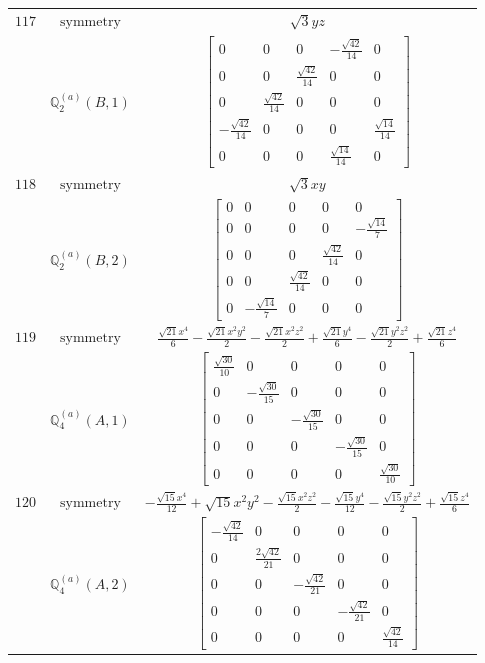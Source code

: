 \documentclass[fleqn,8pt,landscape]{jsarticle}
\begin{document}
\begin{longtable}{ccc}
$ 117 $ & $ \text{symmetry} $ & $ \sqrt{3} y z $ \\
$  $ & $ \mathbb{Q}_{2}^{(a)}(B,1) $ & $ \begin{bmatrix} 0 & 0 & 0 & - \frac{\sqrt{42}}{14} & 0 \\ 0 & 0 & \frac{\sqrt{42}}{14} & 0 & 0 \\ 0 & \frac{\sqrt{42}}{14} & 0 & 0 & 0 \\ - \frac{\sqrt{42}}{14} & 0 & 0 & 0 & \frac{\sqrt{14}}{14} \\ 0 & 0 & 0 & \frac{\sqrt{14}}{14} & 0 \end{bmatrix} $ \\ \hline
$ 118 $ & $ \text{symmetry} $ & $ \sqrt{3} x y $ \\
$  $ & $ \mathbb{Q}_{2}^{(a)}(B,2) $ & $ \begin{bmatrix} 0 & 0 & 0 & 0 & 0 \\ 0 & 0 & 0 & 0 & - \frac{\sqrt{14}}{7} \\ 0 & 0 & 0 & \frac{\sqrt{42}}{14} & 0 \\ 0 & 0 & \frac{\sqrt{42}}{14} & 0 & 0 \\ 0 & - \frac{\sqrt{14}}{7} & 0 & 0 & 0 \end{bmatrix} $ \\ \hline
$ 119 $ & $ \text{symmetry} $ & $ \frac{\sqrt{21} x^{4}}{6} - \frac{\sqrt{21} x^{2} y^{2}}{2} - \frac{\sqrt{21} x^{2} z^{2}}{2} + \frac{\sqrt{21} y^{4}}{6} - \frac{\sqrt{21} y^{2} z^{2}}{2} + \frac{\sqrt{21} z^{4}}{6} $ \\
$  $ & $ \mathbb{Q}_{4}^{(a)}(A,1) $ & $ \begin{bmatrix} \frac{\sqrt{30}}{10} & 0 & 0 & 0 & 0 \\ 0 & - \frac{\sqrt{30}}{15} & 0 & 0 & 0 \\ 0 & 0 & - \frac{\sqrt{30}}{15} & 0 & 0 \\ 0 & 0 & 0 & - \frac{\sqrt{30}}{15} & 0 \\ 0 & 0 & 0 & 0 & \frac{\sqrt{30}}{10} \end{bmatrix} $ \\ \hline
$ 120 $ & $ \text{symmetry} $ & $ - \frac{\sqrt{15} x^{4}}{12} + \sqrt{15} x^{2} y^{2} - \frac{\sqrt{15} x^{2} z^{2}}{2} - \frac{\sqrt{15} y^{4}}{12} - \frac{\sqrt{15} y^{2} z^{2}}{2} + \frac{\sqrt{15} z^{4}}{6} $ \\
$  $ & $ \mathbb{Q}_{4}^{(a)}(A,2) $ & $ \begin{bmatrix} - \frac{\sqrt{42}}{14} & 0 & 0 & 0 & 0 \\ 0 & \frac{2 \sqrt{42}}{21} & 0 & 0 & 0 \\ 0 & 0 & - \frac{\sqrt{42}}{21} & 0 & 0 \\ 0 & 0 & 0 & - \frac{\sqrt{42}}{21} & 0 \\ 0 & 0 & 0 & 0 & \frac{\sqrt{42}}{14} \end{bmatrix} $ \\ \hline

\end{longtable}
\end{document}

